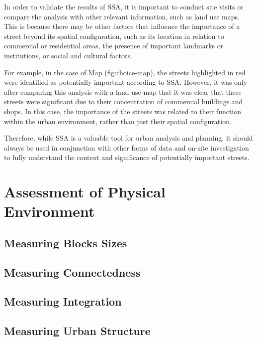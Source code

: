 \documentclass[
]{latex/krantz}
\begin{document}
In order to validate the results of SSA, it is important to conduct site visits or compare the analysis with other relevant information, such as land use maps. This is because there may be other factors that influence the importance of a street beyond its spatial configuration, such as its location in relation to commercial or residential areas, the presence of important landmarks or institutions, or social and cultural factors.

For example, in the case of Map \textcite{ref}(fig:choice-map), the streets highlighted in red were identified as potentially important according to SSA. However, it was only after comparing this analysis with a land use map that it was clear that these streets were significant due to their concentration of commercial buildings and shops. In this case, the importance of the streets was related to their function within the urban environment, rather than just their spatial configuration.

Therefore, while SSA is a valuable tool for urban analysis and planning, it should always be used in conjunction with other forms of data and on-site investigation to fully understand the context and significance of potentially important streets.

\hypertarget{assessment-of-physical-environment}{%
\section{Assessment of Physical Environment}\label{assessment-of-physical-environment}}

\hypertarget{measuring-blocks-sizes}{%
\subsection{Measuring Blocks Sizes}\label{measuring-blocks-sizes}}

\hypertarget{measuring-connectedness}{%
\subsection{Measuring Connectedness}\label{measuring-connectedness}}

\hypertarget{measuring-integration}{%
\subsection{Measuring Integration}\label{measuring-integration}}

\hypertarget{measuring-urban-structure}{%
\subsection{Measuring Urban Structure}\label{measuring-urban-structure}}
\end{document}
